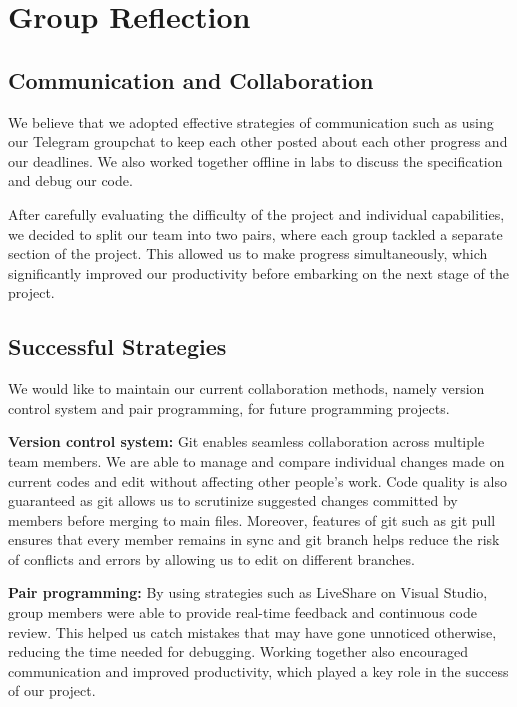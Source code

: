 \documentclass{article}
\begin{document}
    \section{Group Reflection}

        \begin{adjustwidth}{2em}{0pt}
    
        \subsection{Communication and Collaboration}
    
        We believe that we adopted effective strategies of communication such as using our Telegram groupchat to keep each other posted about each other progress and our deadlines. We also worked together offline in labs to discuss the specification and debug our code. 
    
        After carefully evaluating the difficulty of the project and individual capabilities, we decided to split our team into two pairs, where each group tackled a separate section of the project. This allowed us to make progress simultaneously, which significantly improved our productivity before embarking on the next stage of the project.
        
        \subsection{Successful Strategies} 
        
            We would like to maintain our current collaboration methods, namely version control system and pair programming, for future programming projects. 
            
            \textbf{Version control system:} Git enables seamless collaboration across multiple team members. We are able to manage and compare individual changes made on current codes and edit without affecting other people's work. Code quality is also guaranteed as git allows us to scrutinize suggested changes committed by members before merging to main files. Moreover, features of git such as git pull ensures that every member remains in sync and git branch helps reduce the risk of conflicts and errors by allowing us to edit on different branches.  
        
            \textbf{Pair programming:} By using strategies such as LiveShare on Visual Studio, group members were able to provide real-time feedback and continuous code review. This helped us catch mistakes that may have gone unnoticed otherwise, reducing the time needed for debugging. Working together also encouraged communication and improved productivity, which played a key role in the success of our project.
    

\end{adjustwidth}
\end{document}
